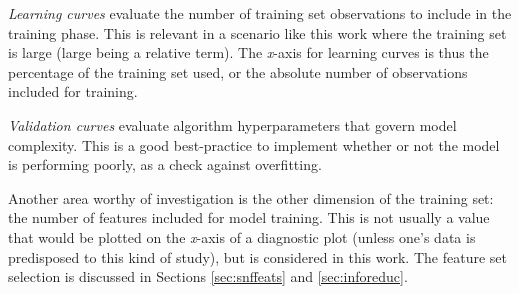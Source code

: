 \textit{Learning curves} evaluate the number of training set observations to
include in the training phase. This is relevant in a scenario like this work
where the training set is large (large being a relative term).  The
\textit{x}-axis for learning curves is thus the percentage of the training set
used, or the absolute number of observations included for training. 

\textit{Validation curves} evaluate algorithm hyperparameters that govern model
complexity. This is a good best-practice to implement whether or not the model 
is performing poorly, as a check against overfitting. 

Another area worthy of investigation is the other dimension of the training
set: the number of features included for model training. This is not usually a
value that would be plotted on the \textit{x}-axis of a diagnostic plot (unless
one's data is predisposed to this kind of study), but is considered in this
work. The feature set selection is discussed in Sections \ref{sec:snffeats} and
\ref{sec:inforeduc}.

